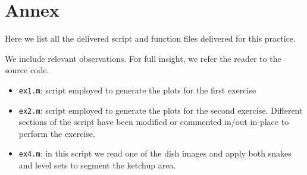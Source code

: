\section{Annex}

Here we list all the delivered script and function files delivered for this practice.

We include relevant observations. For full insight, we refer the reader to the
source code.

\begin{itemize}
	\item \texttt{ex1.m}: script employed to generate the plots for the first exercise
	\item \texttt{ex2.m}: script employed to generate the plots for the second exercise. Different sections of the script have been modified or commented in/out in-place to perform the exercise.
	\item \texttt{ex4.m}: in this script we read one of the dish images and apply both snakes and level sets to segment the ketchup area.

\end{itemize}


